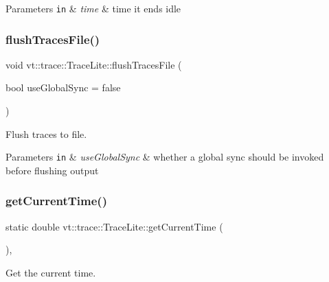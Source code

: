 \begin{DoxyParams}[1]{Parameters}
\mbox{\tt in}  & {\em time} & time it ends idle \\
\hline
\end{DoxyParams}
\mbox{\label{structvt_1_1trace_1_1_trace_lite_a31513ed82d3b3c74369fde81491eb3a2}} 
\subsubsection{\texorpdfstring{flush\+Traces\+File()}{flushTracesFile()}}
{\footnotesize\ttfamily void vt\+::trace\+::\+Trace\+Lite\+::flush\+Traces\+File (\begin{DoxyParamCaption}\item[{bool}]{use\+Global\+Sync = {\ttfamily false} }\end{DoxyParamCaption})}



Flush traces to file. 


\begin{DoxyParams}[1]{Parameters}
\mbox{\tt in}  & {\em use\+Global\+Sync} & whether a global sync should be invoked before flushing output \\
\hline
\end{DoxyParams}
\mbox{\label{structvt_1_1trace_1_1_trace_lite_ad1d8159d645a3b7047ce3f2e0c080f8d}} 
\subsubsection{\texorpdfstring{get\+Current\+Time()}{getCurrentTime()}}
{\footnotesize\ttfamily static double vt\+::trace\+::\+Trace\+Lite\+::get\+Current\+Time (\begin{DoxyParamCaption}{ }\end{DoxyParamCaption})\hspace{0.3cm}{\ttfamily [inline]}, {\ttfamily [static]}}



Get the current time. 

